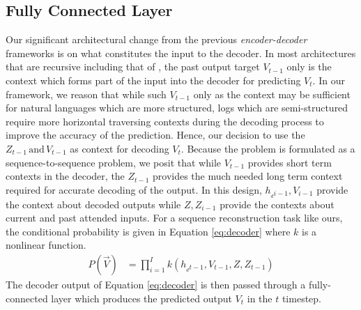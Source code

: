 \subsection{Fully Connected Layer}
\label{subsec:decoder}
Our significant architectural change from the previous \emph{encoder-decoder} 
frameworks is on what constitutes the input to the decoder. In most 
architectures that are recursive including that of \cite{bahdanau2014neural}, 
the past output target $ V_{t-1} $ only is the context which forms part of the 
input into the decoder for predicting $ V_t $. In our framework, we reason that 
while such $ V_{t-1} $ only as the context may be sufficient for natural 
languages which are more structured, logs which are semi-structured require 
more horizontal traversing contexts during the decoding process to improve the 
accuracy of the prediction. Hence, our decision to use the $ Z_{t-1}\, 
\text{and}\, V_{t-1} $ as context for decoding $ V_t $. Because the problem is 
formulated as a sequence-to-sequence problem, we posit that while $ V_{t-1} $ 
provides short term contexts in the decoder, the $ Z_{t-1} $ provides the much 
needed long term context required for accurate decoding of the output. In this 
design, $ h_{_di-1},V_{i-1} $ provide the context about decoded outputs while $ 
Z, Z_{i-1} $ provide the contexts about current and past attended inputs.  For 
a sequence reconstruction task like ours, the conditional probability is given 
in Equation \ref{eq:decoder} where $ k $ is a nonlinear function.
\begin{align}
P\left( \vec{V}\right) &= \prod_{i=1}^Ik\left(h_{_dt-1},V_{t-1},Z, 
Z_{t-1}\right) 
\label{eq:decoder}
\end{align}
The decoder output of Equation \ref{eq:decoder} is then passed through a 
fully-connected layer which produces the predicted output $V_t$ in the $t$ 
timestep.

